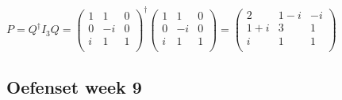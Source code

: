 \begin{oefening}[4.2.4]
    \(P = Q^\dagger I_3 Q =
    \begin{pmatrix}
        1 & 1 & 0\\
        0 & -i & 0 \\
        i & 1 & 1\\
    \end{pmatrix}^\dagger
    \begin{pmatrix}
        1 & 1 & 0\\
        0 & -i & 0 \\
        i & 1 & 1\\
    \end{pmatrix}
    =
     \begin{pmatrix}
        2 & 1-i & -i\\
        1+i & 3 & 1 \\
        i & 1 & 1\\
    \end{pmatrix}
    \)
\end{oefening}

\subsection{Oefenset week 9}

